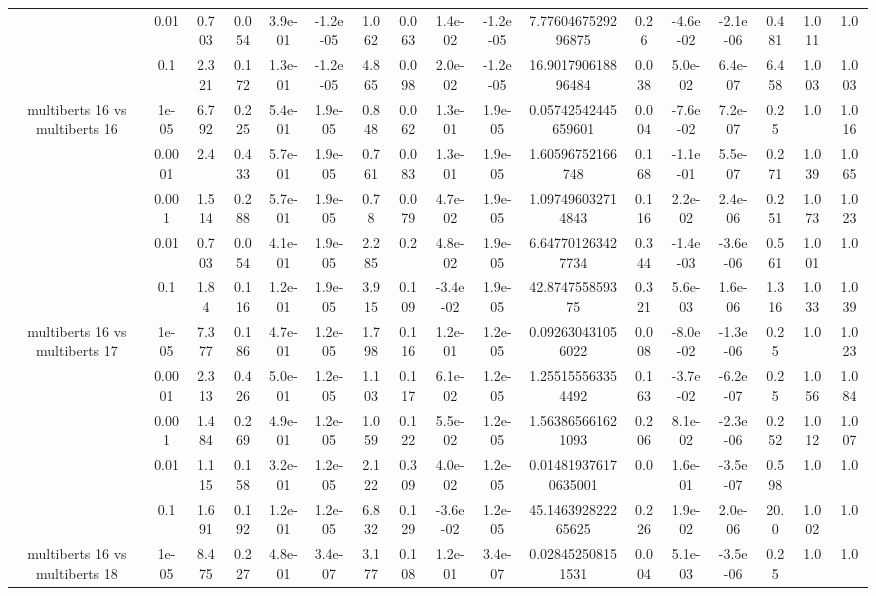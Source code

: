 \begin{tabular}{|c|c|c|c|c|c|c|c|c|c|c|c|c|c|c|c|c|}
 & 0.01 & 0.703 & 0.054 & 3.9e-01 & -1.2e-05 & 1.062 & 0.063 & 1.4e-02 & -1.2e-05 & 7.7760467529296875 & 0.26 & -4.6e-02 & -2.1e-06 & 0.481 & 1.011 & 1.0 \\
 & 0.1 & 2.321 & 0.172 & 1.3e-01 & -1.2e-05 & 4.865 & 0.098 & 2.0e-02 & -1.2e-05 & 16.901790618896484 & 0.038 & 5.0e-02 & 6.4e-07 & 6.458 & 1.003 & 1.003 \\
\hline
\multirow{5}{*}{multiberts 16 vs multiberts 16} & 1e-05 & 6.792 & 0.225 & 5.4e-01 & 1.9e-05 & 0.848 & 0.062 & 1.3e-01 & 1.9e-05 & 0.05742542445659601 & 0.004 & -7.6e-02 & 7.2e-07 & 0.25 & 1.0 & 1.016 \\
 & 0.0001 & 2.4 & 0.433 & 5.7e-01 & 1.9e-05 & 0.761 & 0.083 & 1.3e-01 & 1.9e-05 & 1.60596752166748 & 0.168 & -1.1e-01 & 5.5e-07 & 0.271 & 1.039 & 1.065 \\
 & 0.001 & 1.514 & 0.288 & 5.7e-01 & 1.9e-05 & 0.78 & 0.079 & 4.7e-02 & 1.9e-05 & 1.097496032714843 & 0.116 & 2.2e-02 & 2.4e-06 & 0.251 & 1.073 & 1.023 \\
 & 0.01 & 0.703 & 0.054 & 4.1e-01 & 1.9e-05 & 2.285 & 0.2 & 4.8e-02 & 1.9e-05 & 6.647701263427734 & 0.344 & -1.4e-03 & -3.6e-06 & 0.561 & 1.001 & 1.0 \\
 & 0.1 & 1.84 & 0.116 & 1.2e-01 & 1.9e-05 & 3.915 & 0.109 & -3.4e-02 & 1.9e-05 & 42.874755859375 & 0.321 & 5.6e-03 & 1.6e-06 & 1.316 & 1.033 & 1.039 \\
\hline
\multirow{5}{*}{multiberts 16 vs multiberts 17} & 1e-05 & 7.377 & 0.186 & 4.7e-01 & 1.2e-05 & 1.798 & 0.116 & 1.2e-01 & 1.2e-05 & 0.092630431056022 & 0.008 & -8.0e-02 & -1.3e-06 & 0.25 & 1.0 & 1.023 \\
 & 0.0001 & 2.313 & 0.426 & 5.0e-01 & 1.2e-05 & 1.103 & 0.117 & 6.1e-02 & 1.2e-05 & 1.255155563354492 & 0.163 & -3.7e-02 & -6.2e-07 & 0.25 & 1.056 & 1.084 \\
 & 0.001 & 1.484 & 0.269 & 4.9e-01 & 1.2e-05 & 1.059 & 0.122 & 5.5e-02 & 1.2e-05 & 1.563865661621093 & 0.206 & 8.1e-02 & -2.3e-06 & 0.252 & 1.012 & 1.007 \\
 & 0.01 & 1.115 & 0.158 & 3.2e-01 & 1.2e-05 & 2.122 & 0.309 & 4.0e-02 & 1.2e-05 & 0.014819376170635001 & 0.0 & 1.6e-01 & -3.5e-07 & 0.598 & 1.0 & 1.0 \\
 & 0.1 & 1.691 & 0.192 & 1.2e-01 & 1.2e-05 & 6.832 & 0.129 & -3.6e-02 & 1.2e-05 & 45.146392822265625 & 0.226 & 1.9e-02 & 2.0e-06 & 20.0 & 1.002 & 1.0 \\
\hline
\multirow{5}{*}{multiberts 16 vs multiberts 18} & 1e-05 & 8.475 & 0.227 & 4.8e-01 & 3.4e-07 & 3.177 & 0.108 & 1.2e-01 & 3.4e-07 & 0.028452508151531 & 0.004 & 5.1e-03 & -3.5e-06 & 0.25 & 1.0 & 1.0 \\

\end{tabular}
